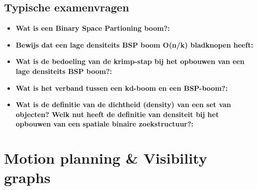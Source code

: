 \documentclass[12pt,a4paper]{article}
\begin{document}
	\subsection{Typische examenvragen}
	\begin{itemize}
		\item \textbf{Wat is een Binary Space Partioning boom?:}\\
		\item \textbf{Bewijs dat een lage densiteits BSP boom O(n/k) bladknopen heeft:}\\
		\item \textbf{Wat is de bedoeling van de krimp-stap bij het opbouwen van een lage densiteits BSP boom?:}\\
		\item \textbf{Wat is het verband tussen een kd-boom en een BSP-boom?:}\\
		\item \textbf{Wat is de definitie van de dichtheid (density) van een set van objecten? Welk nut heeft de definitie van densiteit bij het opbouwen van een spatiale binaire zoekstructuur?:}\\
	\end{itemize}
	
	
	\section{Motion planning \& Visibility graphs}
\end{document}
